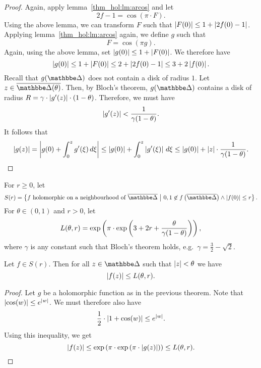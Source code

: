 \begin{proof}
Again, apply lemma~\ref{thm_hol:lm:arcos} and let
\[
2f - 1 = \cos(\pi \cdot F).
\]
Using the above lemma, we can transform $F$ such that
$\left\lvert F(0)\right\rvert \leq 1 + \left\lvert 2f(0) - 1\right\rvert$. Applying
lemma~\ref{thm_hol:lm:arcos} again, we define $g$ such that
\[
F = \cos(\pi g).
\]
Again, using the above lemma, set $\left\lvert g(0)\right\rvert \leq 1 + \left\lvert F(0)\right\rvert$.
We therefore have
\[
\left\lvert g(0)\right\rvert \leq
1 + \left\lvert F(0)\right\rvert \leq
2 + \left\lvert 2f(0) - 1\right\rvert \leq
3 + 2 \left\lvert f(0)\right\rvert.
\]
Recall that $g(\dsk)$ does not contain a disk of radius $1$. Let
$z \in \oline{\dsk(\theta)}$. Then, by Bloch's theorem, $g(\dsk)$
contains a disk of radius
$R = \gamma \cdot \left\lvert g'(z)\right\rvert \cdot (1 - \theta)$. Therefore, we
must have
\[
\left\lvert g'(z)\right\rvert < \frac{1}{\gamma (1 - \theta)}.
\]
It follows that
\[
\left\lvert g(z)\right\rvert =
\left\lvert g(0) + \int_0^z g'(\xi)\,d\xi\right\rvert \leq
\left\lvert g(0)\right\rvert + \int_0^z \left\lvert g'(\xi)\right\rvert\,d\xi \leq
\left\lvert g(0)\right\rvert + \left\lvert z\right\rvert \cdot \frac{1}{\gamma (1 - \theta)}. \qedhere
\]
\end{proof}

\begin{definicija}
For $r \geq 0$, let
\[
S(r) =
\setb{\text{$f$ holomorphic on a neighbourhood of $\oline{\dsk}$}}
{0, 1 \not \in f \br{\oline{\dsk}} \land \abs{f(0)} \leq r}.
\]
For $\theta \in (0, 1)$ and $r > 0$, let
\[
L(\theta, r) =
\exp \left(\pi \cdot
\exp \left(3 + 2r + \frac{\theta}{\gamma (1 - \theta)}\right)\right),
\]
where $\gamma$ is any constant such that Bloch's theorem holds,
e.g.~$\gamma = \frac{3}{2} - \sqrt{2}$.
\end{definicija}

\begin{izrek}[Schottky]
Let $f \in S(r)$. Then for all $z \in \dsk$ such that
$\left\lvert z\right\rvert < \theta$ we have
\[
\left\lvert f(z)\right\rvert \leq L(\theta, r).
\]
\end{izrek}

\begin{proof}
Let $g$ be a holomorphic function as in the previous theorem. Note
that $\left\lvert \cos(w)\right\rvert \leq e^{\left\lvert w\right\rvert}$. We must therefore also have
\[
\frac{1}{2} \cdot \left\lvert 1 + \cos(w)\right\rvert \leq e^{\left\lvert w\right\rvert}.
\]
Using this inequality, we get
\[
\left\lvert f(z)\right\rvert \leq
\exp \left(\pi \cdot \exp \left(\pi \cdot \left\lvert g(z)\right\rvert\right)\right) \leq
L(\theta, r). \qedhere
\]
\end{proof}
